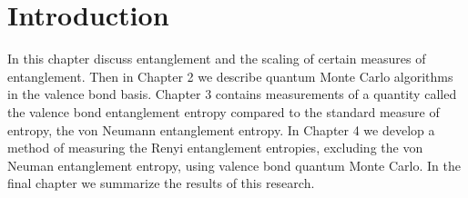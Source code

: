 \chapter{Introduction}




In this chapter discuss entanglement and the scaling of certain measures of entanglement.
Then in Chapter 2 we describe quantum Monte Carlo algorithms in the valence bond basis.
Chapter 3 contains measurements of a quantity called the valence bond entanglement entropy compared to the standard measure of entropy, the von Neumann entanglement entropy.
In Chapter 4 we develop a method of measuring the Renyi entanglement entropies, excluding the von Neuman entanglement entropy, using valence bond quantum Monte Carlo.
In the final chapter we summarize the results of this research.


